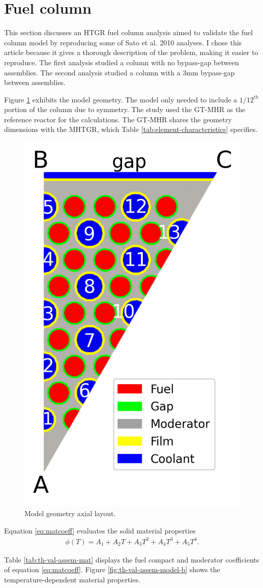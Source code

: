 \section{Fuel column}
\label{sec:fuelcol}

This section discusses an HTGR fuel column analysis aimed to validate the fuel column model by reproducing some of Sato et al. 2010 \cite{sato_computational_2010} analyses.
I chose this article because it gives a thorough description of the problem, making it easier to reproduce.
The first analysis studied a column with no bypass-gap between assemblies.
The second analysis studied a column with a 3mm bypass-gap between assemblies.

Figure \ref{fig:th-val-assem-model-a} exhibits the model geometry.
The model only needed to include a $1/12^{th}$ portion of the column due to symmetry.
The study used the GT-MHR as the reference reactor for the calculations.
The GT-MHR shares the geometry dimensions with the MHTGR, which Table \ref{tab:element-characteristics} specifies.

\begin{figure}[htbp!]
  \centering
  \includegraphics[width=0.25\linewidth]{figures-thermal/val-assem-mesh}
  \hfill
  \caption{Model geometry axial layout.}
  \label{fig:th-val-assem-model-a}
\end{figure}

Equation \ref{eq:matcoeff} evaluates the solid material properties \cite{johnson_cfd_2009}
\begin{align}
  \phi(T) = A_1 + A_2 T + A_3 T^2 + A_4 T^3 + A_5 T^4.  \label{eq:matcoeff}
\end{align}

Table \ref{tab:th-val-assem-mat} displays the fuel compact and moderator coefficients of equation \ref{eq:matcoeff}.
Figure \ref{fig:th-val-assem-model-b} shows the temperature-dependent material properties.

